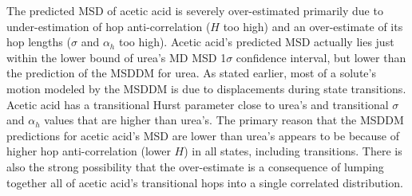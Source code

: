 \documentclass[aps,pre,preprint,groupedaddress]{revtex4-2}
\begin{document}
  The predicted MSD of acetic acid is severely over-estimated primarily due to 
  under-estimation of hop anti-correlation ($H$ too high) and an over-estimate of
  its hop lengths ($\sigma$ and $\alpha_h$ too high). Acetic acid's predicted MSD
  actually lies just within the lower bound of urea's MD MSD 1$\sigma$ confidence
  interval, but lower than the prediction of the MSDDM for urea. As stated earlier,
  most of a solute’s motion modeled by the MSDDM is due to displacements during 
  state transitions. Acetic
  acid has a transitional Hurst parameter close to urea’s and transitional $\sigma$
  and $\alpha_h$ values that are higher than urea’s. The primary reason that the MSDDM
  predictions for acetic acid's MSD are lower than urea's appears to be because of
  higher hop anti-correlation (lower $H$) in all states, including transitions. 
  There is also the strong possibility that the over-estimate is a consequence of
  lumping together all of acetic acid’s transitional hops into a single correlated
  distribution.
\end{document}
